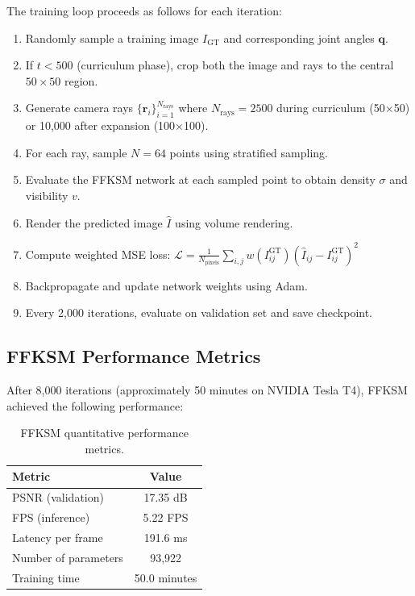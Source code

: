 \documentclass[12pt,a4paper,oneside]{report}
\begin{document}
The training loop proceeds as follows for each iteration:

\begin{enumerate}
    \item Randomly sample a training image $I_{\text{GT}}$ and corresponding joint angles $\mathbf{q}$.
    \item If $t < 500$ (curriculum phase), crop both the image and rays to the central $50 \times 50$ region.
    \item Generate camera rays $\{\mathbf{r}_i\}_{i=1}^{N_{\text{rays}}}$ where $N_{\text{rays}} = 2500$ during curriculum (50×50) or 10,000 after expansion (100×100).
    \item For each ray, sample $N=64$ points using stratified sampling.
    \item Evaluate the FFKSM network at each sampled point to obtain density $\sigma$ and visibility $v$.
    \item Render the predicted image $\hat{I}$ using volume rendering.
    \item Compute weighted MSE loss: $\mathcal{L} = \frac{1}{N_{\text{pixels}}} \sum_{i,j} w(I_{ij}^{\text{GT}}) (\hat{I}_{ij} - I_{ij}^{\text{GT}})^2$
    \item Backpropagate and update network weights using Adam.
    \item Every 2,000 iterations, evaluate on validation set and save checkpoint.
\end{enumerate}

\subsection{FFKSM Performance Metrics}

After 8,000 iterations (approximately 50 minutes on NVIDIA Tesla T4), FFKSM achieved the following performance:

\begin{table}[H]
\centering
\caption{FFKSM quantitative performance metrics.}
\label{tab:ffksm_performance}
\begin{tabular}{lc}
\toprule
Metric & Value \\
\midrule
PSNR (validation) & 17.35 dB \\
FPS (inference) & 5.22 FPS \\
Latency per frame & 191.6 ms \\
Number of parameters & 93,922 \\
Training time & 50.0 minutes \\
\bottomrule
\end{tabular}
\end{table}
\end{document}
